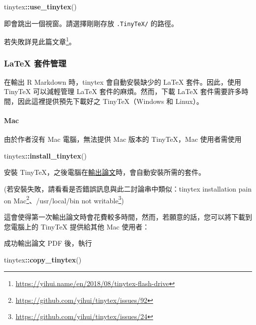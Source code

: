 \documentclass[oneside]{book}
\newenvironment{Shaded}{\begin{snugshade}}{\end{snugshade}}
\newcommand{\KeywordTok}[1]{\textcolor[rgb]{0.13,0.29,0.53}{\textbf{#1}}}
\newcommand{\NormalTok}[1]{#1}
\newcommand{\OperatorTok}[1]{\textcolor[rgb]{0.81,0.36,0.00}{\textbf{#1}}}
\renewcommand{\href}[2]{#2\footnote{\url{#1}}}
\theoremstyle{definition}
\theoremstyle{definition}
\theoremstyle{definition}
\theoremstyle{remark}
\begin{document}
\begin{Shaded}
\begin{Highlighting}[]
\NormalTok{tinytex}\OperatorTok{::}\KeywordTok{use_tinytex}\NormalTok{()}
\end{Highlighting}
\end{Shaded}

即會跳出一個視窗。請選擇剛剛存放 \texttt{.TinyTeX/} 的路徑。

若失敗詳見\href{https://yihui.name/en/2018/08/tinytex-flash-drive}{此篇文章}。

\hypertarget{tinytex-manage}{%
\subsubsection{LaTeX 套件管理}\label{tinytex-manage}}

在輸出 R Markdown 時，tinytex 會自動安裝缺少的 LaTeX 套件。因此，使用 TinyTeX 可以減輕管理 LaTeX 套件的麻煩。然而，下載 LaTeX 套件需要許多時間，因此這裡提供預先下載好之 TinyTeX（Windows 和 Linux）。

\hypertarget{mac}{%
\paragraph{Mac}\label{mac}}

由於作者沒有 Mac 電腦，無法提供 Mac 版本的 TinyTeX，Mac 使用者需使用

\begin{Shaded}
\begin{Highlighting}[]
\NormalTok{tinytex}\OperatorTok{::}\KeywordTok{install_tinytex}\NormalTok{()}
\end{Highlighting}
\end{Shaded}

安裝 TinyTeX，之後電腦在\protect\hyperlink{export-thesis}{輸出論文}時，會自動安裝所需的套件。

(若安裝失敗，請看看是否錯誤訊息與此二討論串中類似：\href{https://github.com/yihui/tinytex/issues/92}{tinytex installation pain on Mac}、\href{https://github.com/yihui/tinytex/issues/24}{/usr/local/bin not writable})

這會使得第一次輸出論文時會花費較多時間，然而，若願意的話，您可以將下載到您電腦上的 TinyTeX 提供給其他 Mac 使用者：

成功輸出論文 PDF 後，執行

\begin{Shaded}
\begin{Highlighting}[]
\NormalTok{tinytex}\OperatorTok{::}\KeywordTok{copy_tinytex}\NormalTok{()}
\end{Highlighting}
\end{Shaded}
\end{document}
